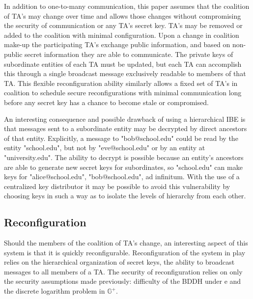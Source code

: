 \documentclass[10pt]{llncs}
\begin{document}
In addition to one-to-many communication, this paper assumes that the coalition of TA's may change over time and allows those changes without compromising the security of communication or any TA's secret key.  TA's may be removed or added to the coalition with minimal configuration.  Upon a change in coalition make-up the participating TA's exchange public information, and based on non-public secret information they are able to communicate.  The private keys of subordinate entities of each TA must be updated, but each TA can accomplish this through a single broadcast message exclusively readable to members of that TA.  This flexible reconfiguration ability similarly allows a fixed set of TA's in coalition to schedule secure reconfigurations with minimal communication long before any secret key has a chance to become stale or compromised.

An interesting consequence and possible drawback of using a hierarchical IBE is that messages sent to a subordinate entity may be decrypted by direct ancestors of that entity.  Explicitly, a message to "bob@school.edu" could be read by the entity "school.edu", but not by "eve@school.edu" or by an entity at "university.edu".  The ability to decrypt is possible because an entity's ancestors are able to generate new secret keys for subordinates, so "school.edu" can make keys for "alice@school.edu", "bob@school.edu", ad infinitum.  With the use of a centralized key distributor it may be possible to avoid this vulnerability by choosing keys in such a way as to isolate the levels of hierarchy from each other.

\subsection{Reconfiguration}

Should the members of the coalition of TA's change, an interesting aspect of this system is that it is quickly reconfigurable.  Reconfiguration of the system in play relies on the hierarchical organization of secret keys, the ability to broadcast messages to all members of a TA.  The security of reconfiguration relies on only the security assumptions made previously: difficulty of the BDDH under e and the discrete logarithm problem in $\mathbb{G}^+$.
 
\end{document}
